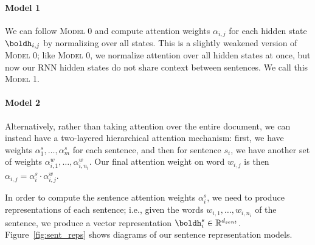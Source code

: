\documentclass[12pt]{report}
\begin{document}
\paragraph{Model 1} We can follow \textsc{Model 0} and compute attention weights $\alpha_{i,j}$ for each hidden state $\boldh_{i,j}$ by normalizing over all states.
This is a slightly weakened version of \textsc{Model 0}; like \textsc{Model 0}, we normalize attention over all hidden states at once, but now our RNN hidden states do not share context between sentences. We call this \textsc{Model 1}.

\paragraph{Model 2} Alternatively, rather than taking attention over the entire document, we can instead have a two-layered hierarchical attention mechanism: first, we have weights $\alpha_1^s, \ldots, \alpha_m^s$ for each sentence, and then for sentence $s_i$, we have another set of weights $\alpha_{i,1}^w, \ldots, \alpha_{i,n_i}^w$.
Our final attention weight on word $w_{i,j}$ is then $\alpha_{i,j} = \alpha_i^s \cdot \alpha_{i,j}^w$.

In order to compute the sentence attention weights $\alpha_i^s$, we need to produce representations of each sentence; i.e., given the words $w_{i,1}, \ldots, w_{i, n_i}$ of the sentence, we produce a vector representation $\boldh^s_i \in \mathbb{R}^{d_{sent}}$. Figure~\ref{fig:sent_reps} shows diagrams of our sentence representation models.
\end{document}
